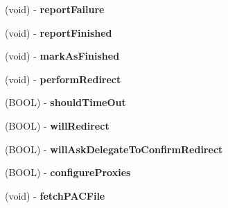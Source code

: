 \begin{DoxyCompactItemize}
\item 
\hypertarget{interface_a_s_i_h_t_t_p_request_07_08_af147c15ba579966f7d4793ebe1eb881b}{
(void) -\/ {\bfseries report\-Failure}}
\label{interface_a_s_i_h_t_t_p_request_07_08_af147c15ba579966f7d4793ebe1eb881b}

\item 
\hypertarget{interface_a_s_i_h_t_t_p_request_07_08_aec6fbf664802e3be7fd4c24a9824e219}{
(void) -\/ {\bfseries report\-Finished}}
\label{interface_a_s_i_h_t_t_p_request_07_08_aec6fbf664802e3be7fd4c24a9824e219}

\item 
\hypertarget{interface_a_s_i_h_t_t_p_request_07_08_a3218690ab3ce9d401f26f7e0d0e2c995}{
(void) -\/ {\bfseries mark\-As\-Finished}}
\label{interface_a_s_i_h_t_t_p_request_07_08_a3218690ab3ce9d401f26f7e0d0e2c995}

\item 
\hypertarget{interface_a_s_i_h_t_t_p_request_07_08_a2862f6f1db8f1146e96470f926561b93}{
(void) -\/ {\bfseries perform\-Redirect}}
\label{interface_a_s_i_h_t_t_p_request_07_08_a2862f6f1db8f1146e96470f926561b93}

\item 
\hypertarget{interface_a_s_i_h_t_t_p_request_07_08_acedb1516f19af14df7b44602b700bae3}{
(\-B\-O\-O\-L) -\/ {\bfseries should\-Time\-Out}}
\label{interface_a_s_i_h_t_t_p_request_07_08_acedb1516f19af14df7b44602b700bae3}

\item 
\hypertarget{interface_a_s_i_h_t_t_p_request_07_08_af19d1ede897c67a86b4d8a62c6395863}{
(\-B\-O\-O\-L) -\/ {\bfseries will\-Redirect}}
\label{interface_a_s_i_h_t_t_p_request_07_08_af19d1ede897c67a86b4d8a62c6395863}

\item 
\hypertarget{interface_a_s_i_h_t_t_p_request_07_08_a38bb6d3bfc36a47f3ace0665762660ae}{
(\-B\-O\-O\-L) -\/ {\bfseries will\-Ask\-Delegate\-To\-Confirm\-Redirect}}
\label{interface_a_s_i_h_t_t_p_request_07_08_a38bb6d3bfc36a47f3ace0665762660ae}

\item 
\hypertarget{interface_a_s_i_h_t_t_p_request_07_08_a81e707733dd891e98faf51eb37093845}{
(\-B\-O\-O\-L) -\/ {\bfseries configure\-Proxies}}
\label{interface_a_s_i_h_t_t_p_request_07_08_a81e707733dd891e98faf51eb37093845}

\item 
\hypertarget{interface_a_s_i_h_t_t_p_request_07_08_a88a7f8b0dfa6f7cc8214d8b52282c6e6}{
(void) -\/ {\bfseries fetch\-P\-A\-C\-File}}
\label{interface_a_s_i_h_t_t_p_request_07_08_a88a7f8b0dfa6f7cc8214d8b52282c6e6}


\end{DoxyCompactItemize}
